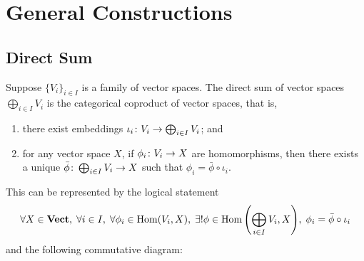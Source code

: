 \section{General Constructions}\label{sec:vsp-constructions}

\subsection*{Direct Sum}

\begin{definition}
    Suppose \({\{V_i\}}_{i \in I}\) is a family of vector spaces.
    The direct sum of vector spaces \(\bigoplus_{i \in I} V_i\)
    is the categorical coproduct of vector spaces, that is,
    \begin{enumerate}[label={(\roman*)}, itemsep=0mm]
        \item there exist embeddings \(\iota_i\colon V_i\to\bigoplus_{i \in I} V_i\); and
        \item for any vector space \(X\),
            if \(\phi_i\colon V_i\to X\) are homomorphisms,
            then there exists a unique \(\bar{\phi}\colon\bigoplus_{i \in I} V_i\to X\)
            such that \(\phi_i = \bar{\phi}\circ\iota_i\).
    \end{enumerate}

    This can be represented by the logical statement
    \begin{equation*}
        \forall X\in\mathbf{Vect},\;
        \forall i \in I,\; \forall \phi_i\in\operatorname{Hom}(V_i,X),\;
        \exists! \phi\in\operatorname{Hom}\qty(\bigoplus_{i \in I} V_i,X),\;
        \phi_i = \bar{\phi}\circ\iota_i
    \end{equation*}
    and the following commutative diagram:
    \begin{center}
    \end{center}
\end{definition}

